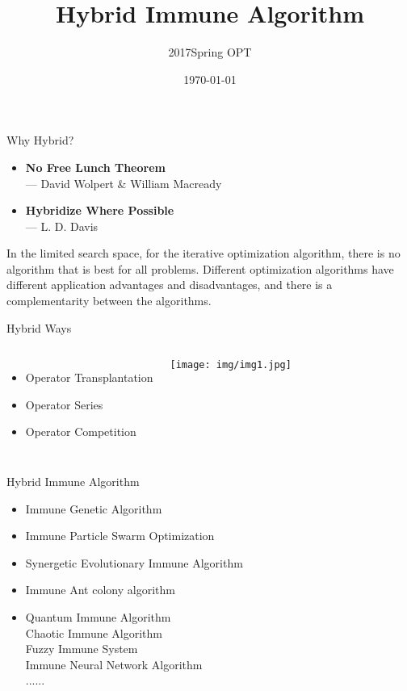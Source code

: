 \documentclass{beamer}
\title{Hybrid Immune Algorithm}
\subtitle{}
\author{2017Spring OPT}
\institute[] 
{Han,Shiqi}
\date{\today}
\begin{document}
\begin{frame}
  \titlepage
\end{frame}

\begin{frame}{Why Hybrid?}
\begin{itemize}
\item {\textbf{No Free Lunch Theorem}\\ \footnotesize{--- David Wolpert \& William Macready}}
\item {\textbf{Hybridize Where Possible}\\ \footnotesize{--- L. D. Davis}}
\end{itemize}
\begin{block}
\small{In the limited search space, for the iterative optimization algorithm, there is no algorithm that is best for all problems. Different optimization algorithms have different application advantages and disadvantages, and there is a complementarity between the algorithms.}
\end{block}
\end{frame}

\begin{frame}{Hybrid Ways}
\begin{columns}[c] 
\begin{itemize}
\item {Operator Transplantation}
\item {Operator Series}
\item {Operator Competition}
\end{itemize}
\texttt{[image: img/img1.jpg]}
\end{columns}
\end{frame}

\begin{frame}{Hybrid Immune Algorithm}
\begin{itemize}
\item{Immune Genetic Algorithm}
\item{Immune Particle Swarm Optimization}
\item{Synergetic Evolutionary Immune Algorithm}
\item{Immune Ant colony algorithm}
\item{
Quantum Immune Algorithm\\
Chaotic Immune Algorithm\\
Fuzzy Immune System\\
Immune Neural Network Algorithm\\
......
}
\end{itemize}
\small
{\noindent

}
\end{frame}
\end{document}
